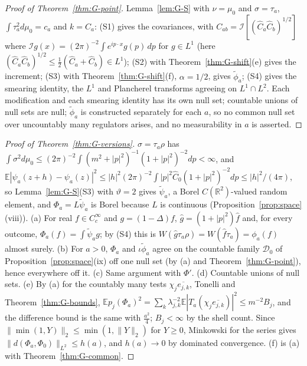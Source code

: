 \documentclass[11pt]{article}
\theoremstyle{plain}
\theoremstyle{definition}
\theoremstyle{remark}
\newcommand{\R}{\mathbb{R}}
\newcommand{\E}{\mathbb{E}}
\newcommand{\cD}{\mathcal{D}}
\newcommand{\cI}{\mathcal{I}}
\newcommand{\conj}[1]{\overline{#1}}
\begin{document}
\begin{proof}[Proof of Theorem~\ref{thm:G-point}]
Lemma~\ref{lem:G-S} with $\nu=\mu_0$ and $\sigma=\tau_a$, $\int\tau_a^{2}d\mu_0=c_a$ and $k=C_a$: (S1) gives the
covariances, with $C_{ab}=\cI[(\hat C_a\hat C_b)^{1/2}]$ where
$\cI g(x)=(2\pi)^{-2}\int e^{ip\cdot x}g(p)\,dp$ for $g\in L^{1}$ (here
$(\hat C_a\hat C_b)^{1/2}\le\tfrac12(\hat C_a+\hat C_b)\in L^{1}$); (S2) with Theorem~\ref{thm:G-shift}(e) gives the
increment; (S3) with Theorem~\ref{thm:G-shift}(f), $\alpha=1/2$, gives $\tilde\phi_a$; (S4) gives the
smearing identity, the $L^{1}$ and Plancherel transforms agreeing on $L^{1}\cap L^{2}$. Each
modification and each smearing identity has its own null set; countable unions
of null sets are null; $\tilde\phi_a$ is constructed separately for each $a$, so no common
null set over uncountably many regulators arises, and no measurability in $a$ is
asserted.
\end{proof}

\begin{proof}[Proof of Theorem~\ref{thm:G-versions}]
$\sigma=\tau_a\rho$ has $\int\sigma^{2}d\mu_0\le(2\pi)^{-2}\int(m^{2}+|p|^{2})^{-1}(1+|p|^{2})^{-2}dp<\infty$, and
$\E|\psi_a(z+h)-\psi_a(z)|^{2}\le|h|^{2}(2\pi)^{-2}\int|p|^{2}\hat C_0(1+|p|^{2})^{-2}dp\le|h|^{2}/(4\pi)$, so
Lemma~\ref{lem:G-S}(S3) with $\vartheta=2$ gives $\tilde\psi_a$, a Borel $C(\R^{2})$-valued random element,
and $\Phi_a=L\tilde\psi_a$ is Borel because $L$ is continuous
(Proposition~\ref{prop:space}(viii)). (a) For real $f\in C_c^{\infty}$ and $g=(1-\Delta)f$,
$\hat g=(1+|p|^{2})\hat f$ and, for every outcome, $\Phi_a(f)=\int\tilde\psi_ag$; by (S4) this is
$W(\hat g\tau_a\rho)=W(\hat f\tau_a)=\phi_a(f)$ almost surely. (b) For $a>0$, $\Phi_a$ and $\iota\tilde\phi_a$ agree on
the countable family $\cD_0$ of Proposition~\ref{prop:space}(ix) off one null set
(by (a) and Theorem~\ref{thm:G-point}), hence everywhere off it. (c) Same argument
with $\Phi'$. (d) Countable unions of null sets. (e) By (a) for the countably many
tests $\chi_j\conj{e_{j,k}}$, Tonelli and Theorem~\ref{thm:G-bounds},
$\E p_j(\Phi_a)^{2}=\sum_k\lambda_{j,k}^{-2}\E|T_a(\chi_j\conj{e_{j,k}})|^{2}\le m^{-2}B_j$, and the difference bound is
the same with $\tfrac{a^{2}}4$; $B_j<\infty$ by the shell count. Since
$\|\min(1,Y)\|_2\le\min(1,\|Y\|_2)$ for $Y\ge0$, Minkowski for the series gives
$\|d(\Phi_a,\Phi_0)\|_{L^{2}}\le h(a)$, and $h(a)\to0$ by dominated convergence. (f) is (a) with
Theorem~\ref{thm:G-common}.
\end{proof}
\end{document}

